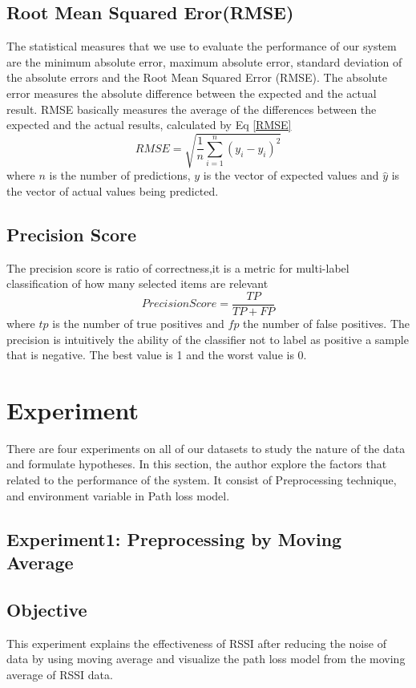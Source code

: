 \subsection{Root Mean Squared Eror(RMSE)}
The statistical measures that we use to evaluate the performance of our
system are the minimum absolute error, maximum absolute error, standard deviation of the absolute errors and the Root Mean Squared Error (RMSE). The
absolute error measures the absolute difference between the expected and the
actual result. RMSE basically measures the average of the differences between
the expected and the actual results, calculated by Eq \ref{RMSE}
\begin{equation}
RMSE = \sqrt{\frac{1}{n} \sum_{i=1}^{n} (y_i-\hat{y_i})^2}
\label{RMSE}
\end{equation}
where $n$ is the number of predictions, $y$ is the vector of expected values and $\hat{y}$ is the vector of actual values being predicted.
\subsection{Precision Score}
The precision score is ratio of correctness,it is a metric for multi-label classification of how many selected items are relevant
\begin{equation}
Precision Score = \frac{TP}{TP+FP}
\label{precision}
\end{equation}
where $tp$ is the number of true positives and $fp$ the number of false positives. The precision is intuitively the ability of the classifier not to label as positive a sample that is negative.
The best value is 1 and the worst value is 0.


\section{Experiment}
There are four experiments on all of our datasets to study the nature of the data and formulate hypotheses. In this section, the author explore the factors that related to the performance of the system. It consist of Preprocessing technique, and environment variable in Path loss model. 
\subsection{Experiment1: Preprocessing by Moving Average}
\subsection*{Objective}
\noindent This experiment explains the effectiveness of RSSI after reducing the noise of data by using moving average and visualize the path loss model from the moving average of RSSI data.



